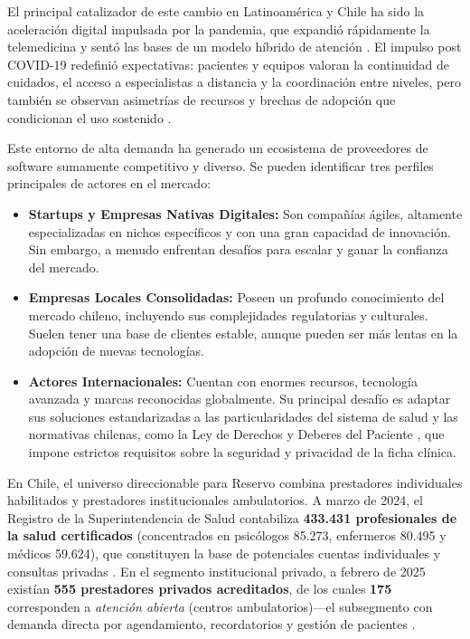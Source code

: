 El principal catalizador de este cambio en Latinoamérica y Chile ha sido la aceleración digital impulsada por la pandemia, que expandió rápidamente la telemedicina y sentó las bases de un modelo híbrido de atención \citep{SuperSalud2025}. El impulso post COVID-19 redefinió expectativas: pacientes y equipos valoran la continuidad de cuidados, el acceso a especialistas a distancia y la coordinación entre niveles, pero también se observan asimetrías de recursos y brechas de adopción que condicionan el uso sostenido \citep{RevChilSalud2025}.

Este entorno de alta demanda ha generado un ecosistema de proveedores de software sumamente competitivo y diverso. Se pueden identificar tres perfiles principales de actores en el mercado:

\begin{itemize}
    \item \textbf{Startups y Empresas Nativas Digitales:} Son compañías ágiles, altamente especializadas en nichos específicos y con una gran capacidad de innovación. Sin embargo, a menudo enfrentan desafíos para escalar y ganar la confianza del mercado.
    
    \item \textbf{Empresas Locales Consolidadas:} Poseen un profundo conocimiento del mercado chileno, incluyendo sus complejidades regulatorias y culturales. Suelen tener una base de clientes estable, aunque pueden ser más lentas en la adopción de nuevas tecnologías.
    
    \item \textbf{Actores Internacionales:} Cuentan con enormes recursos, tecnología avanzada y marcas reconocidas globalmente. Su principal desafío es adaptar sus soluciones estandarizadas a las particularidades del sistema de salud y las normativas chilenas, como la Ley de Derechos y Deberes del Paciente \citep{Ley20584}, que impone estrictos requisitos sobre la seguridad y privacidad de la ficha clínica.

\end{itemize}

En Chile, el universo direccionable para Reservo combina prestadores individuales habilitados y prestadores institucionales ambulatorios. A marzo de 2024, el Registro de la Superintendencia de Salud contabiliza \textbf{433.431 profesionales de la salud certificados} (concentrados en psicólogos 85.273, enfermeros 80.495 y médicos 59.624), que constituyen la base de potenciales cuentas individuales y consultas privadas \citep{ClinicasChile2025}. En el segmento institucional privado, a febrero de 2025 existían \textbf{555 prestadores privados acreditados}, de los cuales \textbf{175} corresponden a \textit{atención abierta} (centros ambulatorios)—el subsegmento con demanda directa por agendamiento, recordatorios y gestión de pacientes \citep{Superintendencia2025Acreditados}.

